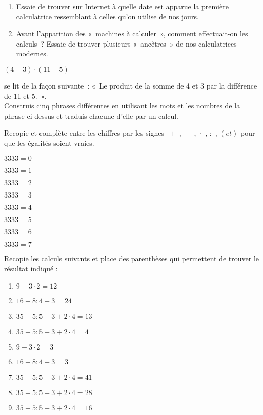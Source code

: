 \begin{exercice}
 \begin{enumerate}
  \item Essaie de trouver sur Internet à quelle date est apparue la première calculatrice ressemblant à celles qu'on utilise de nos jours.
  \item Avant l'apparition des « machines à calculer », comment effectuait-on les calculs ? Essaie de trouver plusieurs « ancêtres » de nos calculatrices modernes.
  \end{enumerate}
\end{exercice}


\begin{exercice}
\begin{center} $(4 + 3) \cdot (11 - 5)$ \end{center}
se lit de la façon suivante : « Le produit de la somme de 4 et 3 par la différence de 11 et 5. ». \\[0.75em]
Construis cinq phrases différentes en utilisant les mots et les nombres de la phrase ci-dessus et traduis chacune d’elle par un calcul.
\end{exercice}


\begin{exercice}
Recopie et complète entre les chiffres par les signes  \textcolor{B1}{$+$} , \textcolor{B1}{$-$} , \textcolor{B1}{$\cdot$} , \textcolor{B1}{$:$} , \textcolor{B1}{$( et )$} pour que les égalités soient vraies.
\begin{colenumerate}{3}
 \item $3 3 3 3 = 0$
 \item $3 3 3 3 = 1$
 \item $3 3 3 3 = 2$
 \item $3 3 3 3 = 3$
 \item $3 3 3 3 = 4$
 \item $3 3 3 3 = 5$
 \item $3 3 3 3 = 6$
 \item $3 3 3 3 = 7$
 \end{colenumerate}
\end{exercice}


\begin{exercice}
Recopie les calculs suivants et place des parenthèses qui permettent de trouver le résultat indiqué :
\begin{enumerate}
 \item $9 - 3 \cdot 2 = 12$
 \item $16 + 8 : 4 - 3 = 24$
 \item $35 + 5 : 5 - 3 + 2 \cdot 4 = 13$
 \item $35 + 5 : 5 - 3 + 2 \cdot 4 = 4$
 \item $9 - 3 \cdot 2 = 3$
 \item $16 + 8 : 4 - 3 = 3$
 \item $35 + 5 : 5 - 3 + 2 \cdot 4 = 41$
 \item $35 + 5 : 5 - 3 + 2 \cdot 4 = 28$
 \item $35 + 5 : 5 - 3 + 2 \cdot 4 = 16$
 \end{enumerate}
\end{exercice}


